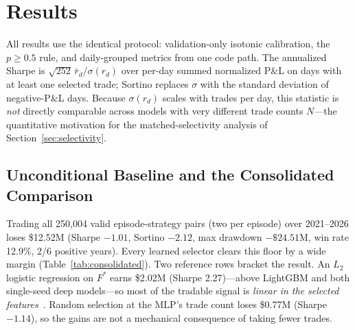 \documentclass[sigconf,review,anonymous]{acmart}
\begin{document}
\section{Results}
\label{sec:results}

All results use the identical protocol: validation-only isotonic calibration, the $p\ge0.5$ rule, and daily-grouped metrics from one code path. The annualized Sharpe is $\sqrt{252}\,\bar r_d/\sigma(r_d)$ over per-day summed normalized P\&L on days with at least one selected trade; Sortino replaces $\sigma$ with the standard deviation of negative-P\&L days. Because $\sigma(r_d)$ scales with trades per day, this statistic is \emph{not} directly comparable across models with very different trade counts $N$---the quantitative motivation for the matched-selectivity analysis of Section~\ref{sec:selectivity}.

\subsection{Unconditional Baseline and the Consolidated Comparison}
Trading all 250{,}004 valid episode-strategy pairs (two per episode) over 2021--2026 loses \$12.52M (Sharpe $-1.01$, Sortino $-2.12$, max drawdown $-\$24.51$M, win rate 12.9\%, 2/6 positive years). Every learned selector clears this floor by a wide margin (Table~\ref{tab:consolidated}). Two reference rows bracket the result. An $L_2$ logistic regression on $F^{\ast}$ earns \$2.02M (Sharpe 2.27)---above LightGBM and both single-seed deep models---so most of the tradable signal is \emph{linear in the selected features}~\cite{grinsztajn2022why,shwartzziv2022tabular}. Random selection at the MLP's trade count loses \$0.77M (Sharpe $-1.14$), so the gains are not a mechanical consequence of taking fewer trades.
\end{document}
